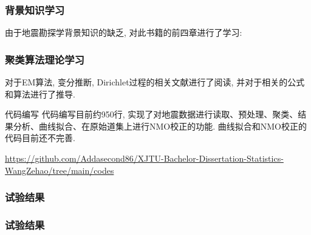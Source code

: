 \documentclass[11pt, professionalfonts]{beamer}
\begin{document}
{\begin{frame}
    \frametitle{背景知识学习}
    由于地震勘探学背景知识的缺乏, 对此书籍的前四章进行了学习: 

    \vspace{15pt}
\end{frame}

\begin{frame}
    \frametitle{聚类算法理论学习}

    对于EM算法, 变分推断, Dirichlet过程的相关文献进行了阅读, 并对于相关的公式和算法进行了推导. 

    \vspace{10pt}

    \vspace{10pt}
\end{frame}


\begin{frame}{代码编写}
    代码编写目前约950行, 实现了对地震数据进行读取、预处理、聚类、结果分析、曲线拟合、在原始道集上进行NMO校正的功能. 曲线拟合和NMO校正的代码目前还不完善. 

    \vspace{15pt}\url{https://github.com/Addasecond86/XJTU-Bachelor-Dissertation-Statistics-WangZehao/tree/main/codes}
\end{frame}

\begin{frame}
    \frametitle{试验结果}
\end{frame}

\begin{frame}
    \frametitle{试验结果}
\end{frame}

}
\end{document}
